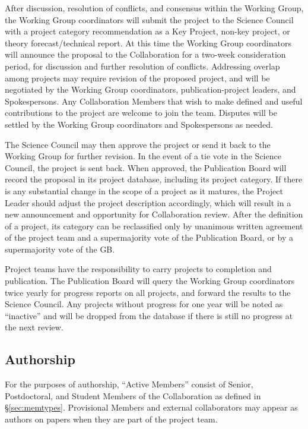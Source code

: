 \documentclass[12pt]{article}
\newcommand{\Comment}[1]{\textcolor{Blue}{(Comment: #1)}}
\begin{document}
After discussion, resolution of conflicts, and consensus within the Working Group, the Working Group coordinators will submit the project to the Science Council with a project category recommendation as a Key Project, non-key project, or theory forecast/technical report.  At this time the Working Group coordinators will announce the proposal to the Collaboration for a two-week consideration period, for discussion and further resolution of conflicts.  Addressing overlap among projects may require revision of the proposed project, and will be negotiated by the Working Group coordinators, publication-project leaders, and Spokespersons.  Any Collaboration Members that wish to make defined and useful contributions to the project are welcome to join the team.  Disputes will be settled by the Working Group coordinators and Spokespersons as needed.  

The Science Council may then approve the project or send it back to the Working Group for further revision.  In the event of a tie vote in the Science Council, the project is sent back.  When approved, the Publication Board will record the proposal in its project database, including its project category.  If there is any substantial change in the scope of a project as it matures, the Project Leader should adjust the project description accordingly, which will result in a new announcement and opportunity for Collaboration review.  After the definition of a project, its category can be reclassified only by unanimous written agreement of the project team and a supermajority vote of the Publication Board,  or by a supermajority vote of the GB.

Project teams have the responsibility to carry projects to completion and publication.  The Publication Board will query the Working Group coordinators twice yearly for progress reports on all projects, and forward the results to the Science Council.  Any projects without progress for one year will be noted as ``inactive'' and will be dropped from the database if there is still no progress at the next review.

\subsection{Authorship}

For the purposes of authorship, ``Active Members'' consist of Senior, Postdoctoral, and Student Members of the Collaboration as defined in \S\ref{sec:memtypes}.  Provisional Members and external collaborators may appear as authors on papers when they are part of the project team.
\end{document}
